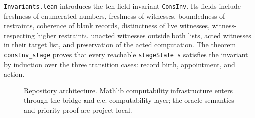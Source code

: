 \texttt{Invariants.lean} introduces the ten-field invariant
\texttt{ConsInv}.  Its fields include freshness of enumerated numbers,
freshness of witnesses, boundedness of restraints, coherence of blank
records, distinctness of live witnesses, witness-respecting higher
restraints, unacted witnesses outside both lists, acted witnesses in their
target list, and preservation of the acted computation.  The theorem
\texttt{consInv_stage} proves that every reachable \texttt{stageState s}
satisfies the invariant by induction over the three transition cases:
record birth, appointment, and action.

\begin{figure}
\centering

\caption{Repository architecture.  Mathlib computability infrastructure
enters through the bridge and c.e. computability layer; the oracle
semantics and priority proof are project-local.}
\end{figure}


